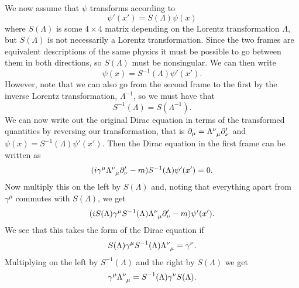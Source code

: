 \documentclass[fleqn]{NotesClass}
\begin{document}
    We now assume that \(\psi\) transforms according to
    \begin{equation}
        \psi'(x') = S(\Lambda)\psi(x)
    \end{equation}
    where \(S(\Lambda)\) is some \(4 \times 4\) matrix depending on the Lorentz transformation \(\Lambda\), but \(S(\Lambda)\) is not necessarily a Lorentz transformation.
    Since the two frames are equivalent descriptions of the same physics it must be possible to go between them in both directions, so \(S(\Lambda)\) must be nonsingular.
    We can then write
    \begin{equation}
        \psi(x) = S^{-1}(\Lambda)\psi'(x').
    \end{equation}
    However, note that we can also go from the second frame to the first by the inverse Lorentz transformation, \(\Lambda^{-1}\), so we must have that
    \begin{equation}
        S^{-1}(\Lambda) = S(\Lambda^{-1}).
    \end{equation}
    We can now write out the original Dirac equation in terms of the transformed quantities by reversing our transformation, that is \(\partial_\mu = \tensor{\Lambda}{^\nu_\mu}\partial'_\nu\) and \(\psi(x) = S^{-1}(\Lambda)\psi'(x')\).
    Then the Dirac equation in the first frame can be written as
    \begin{equation}
        (i\gamma^\mu \tensor{\Lambda}{^\nu_\mu}\partial'_\nu - m)S^{-1}(\Lambda)\psi'(x') = 0.
    \end{equation}
    Now multiply this on the left by \(S(\Lambda)\) and, noting that everything apart from \(\gamma^\mu\) commutes with \(S(\Lambda)\), we get
    \begin{equation}
        (iS(\Lambda)\gamma^\mu S^{-1}(\Lambda) \tensor{\Lambda}{^\nu_\mu}\partial'_\nu - m)\psi'(x').
    \end{equation}
    We see that this takes the form of the Dirac equation if
    \begin{equation}
        S(\Lambda)\gamma^\mu S^{-1}(\Lambda)\tensor{\Lambda}{^\nu_\mu} = \gamma^\nu.
    \end{equation}
    Multiplying on the left by \(S^{-1}(\Lambda)\) and the right by \(S(\Lambda)\) we get
    \begin{equation}\label{eqn:spinor and Lorentz transformation of gamma matrices}
        \gamma^\mu \tensor{\Lambda}{^\nu_\mu} = S^{-1}(\Lambda)\gamma^\nu S(\Lambda).
    \end{equation}
    
\end{document}
